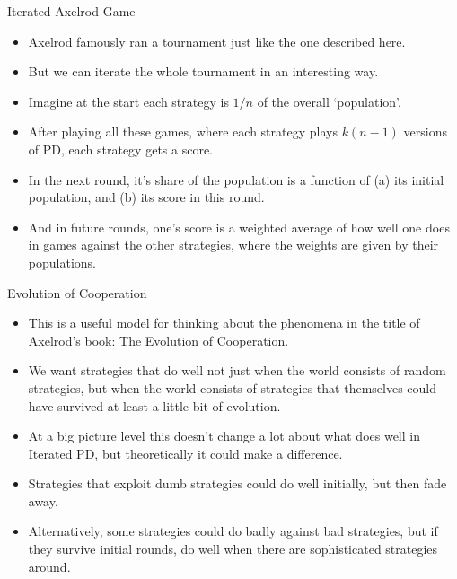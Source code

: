 \documentclass[
  ignorenonframetext,
]{beamer}
\providecommand{\tightlist}{%
  \setlength{\itemsep}{0pt}\setlength{\parskip}{0pt}}
\begin{document}
\begin{frame}{Iterated Axelrod Game}
\protect\hypertarget{iterated-axelrod-game}{}
\begin{itemize}
\tightlist
\item
  Axelrod famously ran a tournament just like the one described here.
\item
  But we can iterate the whole tournament in an interesting way.
\item
  Imagine at the start each strategy is \(1/n\) of the overall
  `population'.
\item
  After playing all these games, where each strategy plays \(k(n-1)\)
  versions of PD, each strategy gets a score.
\item
  In the next round, it's share of the population is a function of (a)
  its initial population, and (b) its score in this round.
\item
  And in future rounds, one's score is a weighted average of how well
  one does in games against the other strategies, where the weights are
  given by their populations.
\end{itemize}
\end{frame}

\begin{frame}{Evolution of Cooperation}
\protect\hypertarget{evolution-of-cooperation}{}
\begin{itemize}
\tightlist
\item
  This is a useful model for thinking about the phenomena in the title
  of Axelrod's book: The Evolution of Cooperation.
\item
  We want strategies that do well not just when the world consists of
  random strategies, but when the world consists of strategies that
  themselves could have survived at least a little bit of evolution.
\item
  At a big picture level this doesn't change a lot about what does well
  in Iterated PD, but theoretically it could make a difference.
\item
  Strategies that exploit dumb strategies could do well initially, but
  then fade away.
\item
  Alternatively, some strategies could do badly against bad strategies,
  but if they survive initial rounds, do well when there are
  sophisticated strategies around.
\end{itemize}
\end{frame}
\end{document}
